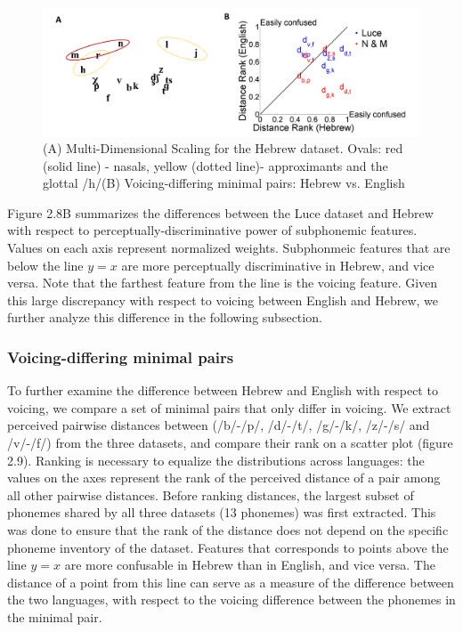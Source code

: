 \begin{figure}
\vspace{.3in}
\includegraphics[width=\linewidth]{Figures/Ch2/Slide5.PNG}
\caption{(A) Multi-Dimensional Scaling for the Hebrew dataset. Ovals: red (solid line) - nasals, yellow (dotted line)- approximants and the glottal /h/(B) Voicing-differing minimal pairs: Hebrew vs. English}
\end{figure}

Figure 2.8B summarizes the differences between the Luce dataset and Hebrew with respect to perceptually-discriminative power of subphonemic features. Values on each axis represent normalized weights. Subphonmeic features that are below the line $y = x$ are more perceptually discriminative in Hebrew, and vice versa. Note that the farthest feature from the line is the voicing feature. Given this large discrepancy with respect to voicing between English and Hebrew, we further analyze this difference in the following subsection.

\subsubsection{Voicing-differing minimal pairs} To further examine the difference between Hebrew and English with respect to voicing, we compare a set of minimal pairs that only differ in voicing. We extract perceived pairwise distances between (/b/-/p/, /d/-/t/, /g/-/k/, /z/-/s/ and /v/-/f/) from the three datasets, and compare their rank on a scatter plot (figure 2.9). Ranking is necessary to equalize the distributions across languages: the values on the axes represent the rank of the perceived distance of a pair among all other pairwise distances. Before ranking distances, the largest subset of phonemes shared by all three datasets (13 phonemes) was first extracted. This was done to ensure that the rank of the distance does not depend on the specific phoneme inventory of the dataset. Features that corresponds to points above the line $y=x$ are more confusable in Hebrew than in English, and vice versa. The distance of a point from this line can serve as a measure of the difference between the two languages, with respect to the voicing difference between the phonemes in the minimal pair.

